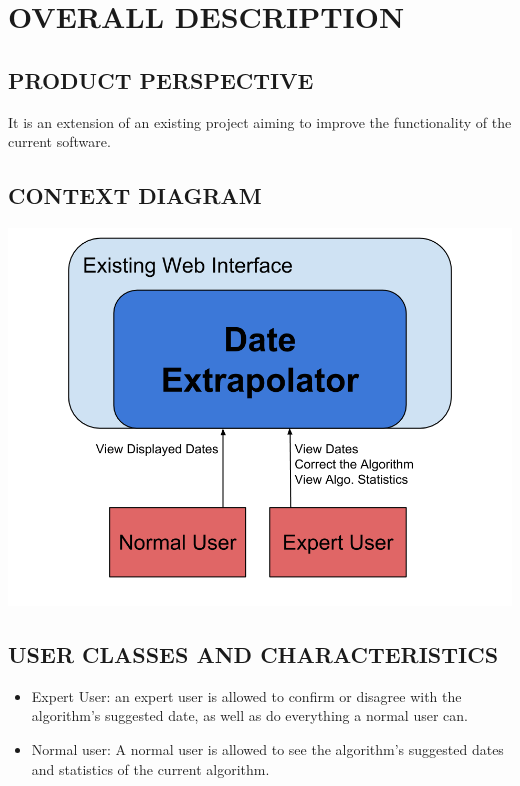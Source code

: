 \documentclass[11pt]{article}
\begin{document}
\section{OVERALL DESCRIPTION}
\subsection{PRODUCT PERSPECTIVE}
It is an extension of an existing project aiming to improve the functionality of the current software.

\subsection{CONTEXT DIAGRAM}
\begin{center}
\includegraphics[scale=0.4]{ContextDiagram.png}
\end{center}

\subsection{USER CLASSES AND CHARACTERISTICS}
\begin{itemize}
    \item Expert User: an expert user is allowed to confirm or disagree with the algorithm’s suggested date, as well as do everything a normal user can.
    \item Normal user: A normal user is allowed to see the algorithm’s suggested dates and statistics of the current algorithm.
\end{itemize}
\end{document}
